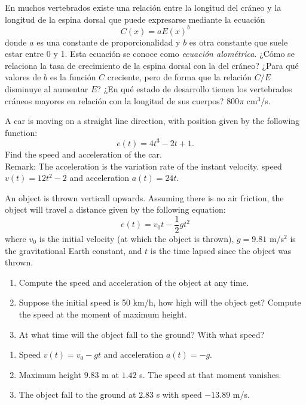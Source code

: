 {En muchos vertebrados existe una relación entre la longitud del cráneo y la longitud de la espina dorsal que puede expresarse mediante la ecuación
\[
C(x) = a E(x)^b
\]
donde $a$ es una constante de proporcionalidad y $b$ es otra constante que suele estar entre 0 y 1.
Esta ecuación se conoce como \emph{ecuación alométrica}.
¿Cómo se relaciona la tasa de crecimiento de la espina dorsal con la del cráneo?
¿Para qué valores de $b$ es la función $C$ creciente, pero de forma que la relación $C/E$ disminuye al aumentar $E$?
¿En qué estado de desarrollo tienen los vertebrados cráneos mayores en relación con la longitud de sus cuerpos?
}
{$800\pi$ cm$^3$/s.
}
{
}


{A car is moving on a straight line direction, with position given by the following function:
\[
e(t) = 4t^3 -2t +1.
\]
Find the speed and acceleration of the car.\\
Remark: The acceleration is the variation rate of the instant velocity.
}
{speed $v(t)=12t^2-2$ and acceleration $a(t)=24t$.
}
{
}


{An object is thrown verticall upwards.
Assuming there is no air friction, the object will travel a distance given by the following equation:
\[
e(t) =v_0t-\frac{1}{2}gt^2
\]
where $v_0$ is the initial velocity (at which the object is thrown), $g=9.81$ m/s$^2$ is the gravitational Earth constant, and $t$ is the time lapsed since the object was thrown.
\begin{enumerate}
\item Compute the speed and acceleration of the object at any time.
\item Suppose the initial speed is 50 km/h, how high will the object get?
Compute the speed at the moment of maximum height.
\item At what time will the object fall to the ground?
With what speed?
\end{enumerate}
}
{\begin{enumerate}
\item Speed $v(t)=v_0-gt$ and acceleration $a(t)=-g$.
\item Maximum height $9.83$ m at $1.42$ s. The speed at that moment vanishes.
\item The object fall to the ground at $2.83$ s with speed $-13.89$ m/s.
\end{enumerate}
}
{
}


